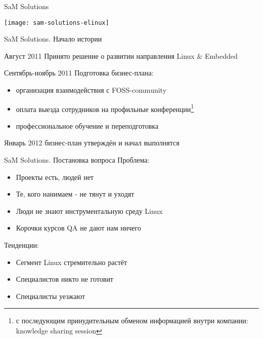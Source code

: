 \begin{frame}{SaM Solutions}
  \begin{center}
    \texttt{[image: sam-solutions-elinux]}
  \end{center}
\end{frame}

\begin{frame}{SaM Solutions. Начало истории}
  \begin{block}{Август 2011}
    Принято решение о развитии направления Linux \& Embedded
  \end{block} \pause

  \begin{block}{Сентябрь-ноябрь 2011}
    Подготовка бизнес-плана:
    \begin{itemize}
      \item организация взаимодействия с FOSS-community
      \item оплата выезда сотрудников на профильные конференции\footnote{с последующим принудительным обменом информацией внутри компании: knowledge sharing session}
      \item профессиональное обучение и переподготовка
    \end{itemize}
  \end{block} \pause

  \begin{block}{Январь 2012}
    бизнес-план утверждён и начал выполнятся
  \end{block}

\end{frame}

\begin{frame}{SaM Solutions. Постановка вопроса}
  \alert{Проблема}:
  \begin{itemize}
    \item Проекты есть, людей нет
    \item Те, кого нанимаем - не тянут и уходят
    \item Люди не знают инструментальную среду Linux
    \item Корочки курсов QA не дают нам ничего 
  \end{itemize} \pause

  \alert{Тенденции}:
  \begin{itemize}
    \item Сегмент Linux стремительно растёт
    \item Специалистов никто не готовит 
    \item Специалисты уезжают
  \end{itemize} \pause
    
\end{frame}

